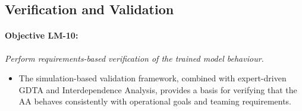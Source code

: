 \documentclass[12pt,a4paper]{article} %
\begin{document}
	\subsection*{Verification and Validation}
	
	\paragraph{Objective LM-10:} \textit{Perform requirements-based verification of the trained model behaviour.}
	
	\begin{itemize}
	  \item The simulation-based validation framework, combined with expert-driven GDTA and Interdependence Analysis, provides a basis for verifying that the AA behaves consistently with operational goals and teaming requirements.
	\end{itemize}

	\printbibliography 
\end{document}
